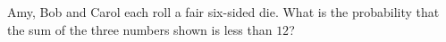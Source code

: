 Amy, Bob and Carol each roll a fair six-sided die. What is the probability that the sum of the three numbers shown is less than $12$?
